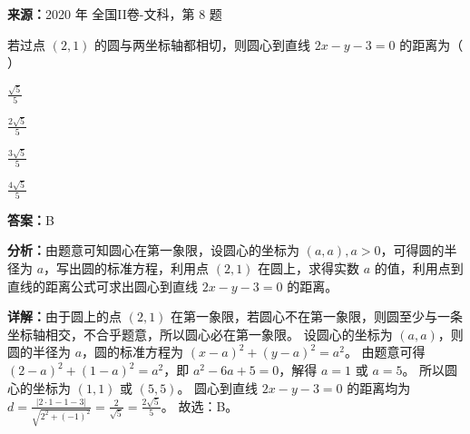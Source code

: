 \begin{question}[points=5]
\textbf{来源：}2020 年 全国II卷-文科，第 8 题\par
若过点 $(2,1)$ 的圆与两坐标轴都相切，则圆心到直线 $2x-y-3=0$ 的距离为（ ）
\begin{choices}
  \item $\frac{\sqrt{5}}{5}$
  \item $\frac{2\sqrt{5}}{5}$
  \item $\frac{3\sqrt{5}}{5}$
  \item $\frac{4\sqrt{5}}{5}$
\end{choices}
\begin{solution}
\textbf{答案：}B

\textbf{分析：}由题意可知圆心在第一象限，设圆心的坐标为 $(a,a), a>0$，可得圆的半径为 $a$，写出圆的标准方程，利用点 $(2,1)$ 在圆上，求得实数 $a$ 的值，利用点到直线的距离公式可求出圆心到直线 $2x-y-3=0$ 的距离。

\textbf{详解：}由于圆上的点 $(2,1)$ 在第一象限，若圆心不在第一象限，则圆至少与一条坐标轴相交，不合乎题意，所以圆心必在第一象限。
设圆心的坐标为 $(a,a)$，则圆的半径为 $a$，圆的标准方程为 $(x-a)^2+(y-a)^2=a^2$。
由题意可得 $(2-a)^2+(1-a)^2=a^2$，即 $a^2-6a+5=0$，解得 $a=1$ 或 $a=5$。
所以圆心的坐标为 $(1,1)$ 或 $(5,5)$。
圆心到直线 $2x-y-3=0$ 的距离均为 $d = \frac{|2\cdot1-1-3|}{\sqrt{2^2+(-1)^2}} = \frac{2}{\sqrt{5}} = \frac{2\sqrt{5}}{5}$。
故选：B。
\end{solution}
\end{question}

